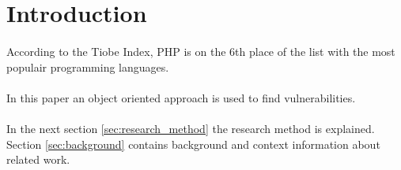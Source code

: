 \documentclass[main.tex]{subfiles}
\begin{document}
    \section{Introduction}\label{sec:introduction}

    \paragraph{} %
        According to the Tiobe Index\cite{Tiobe:2014}, PHP is on the 6th place of the list with the most populair programming languages.
        
    \paragraph{} %
        
       
    \paragraph{} %
        In this paper an object oriented approach is used to find vulnerabilities.
       
    \paragraph{} %
        In the next section \ref{sec:research_method} the research method is explained.
        Section \ref{sec:background} contains background and context information about related work.
      
\end{document}
